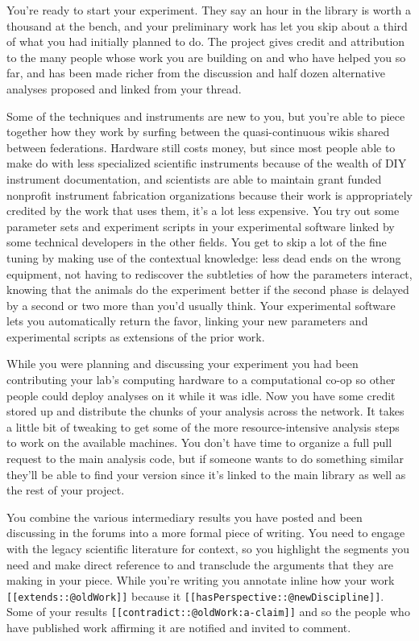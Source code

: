 You're ready to start your experiment. They say an hour in the library
is worth a thousand at the bench, and your preliminary work has let you
skip about a third of what you had initially planned to do. The project
gives credit and attribution to the many people whose work you are
building on and who have helped you so far, and has been made richer
from the discussion and half dozen alternative analyses proposed and
linked from your thread.

Some of the techniques and instruments are new to you, but you're able
to piece together how they work by surfing between the quasi-continuous
wikis shared between federations. Hardware still costs money, but since
most people able to make do with less specialized scientific instruments
because of the wealth of DIY instrument documentation, and scientists
are able to maintain grant funded nonprofit instrument fabrication
organizations because their work is appropriately credited by the work
that uses them, it's a lot less expensive. You try out some parameter
sets and experiment scripts in your experimental software linked by some
technical developers in the other fields. You get to skip a lot of the
fine tuning by making use of the contextual knowledge: less dead ends on
the wrong equipment, not having to rediscover the subtleties of how the
parameters interact, knowing that the animals do the experiment better
if the second phase is delayed by a second or two more than you'd
usually think. Your experimental software lets you automatically return
the favor, linking your new parameters and experimental scripts as
extensions of the prior work.

While you were planning and discussing your experiment you had been
contributing your lab's computing hardware to a computational co-op so
other people could deploy analyses on it while it was idle. Now you have
some credit stored up and distribute the chunks of your analysis across
the network. It takes a little bit of tweaking to get some of the more
resource-intensive analysis steps to work on the available machines. You
don't have time to organize a full pull request to the main analysis
code, but if someone wants to do something similar they'll be able to
find your version since it's linked to the main library as well as the
rest of your project.

You combine the various intermediary results you have posted and been
discussing in the forums into a more formal piece of writing. You need
to engage with the legacy scientific literature for context, so you
highlight the segments you need and make direct reference to and
transclude the arguments that they are making in your piece. While
you're writing you annotate inline how your work
\texttt{{[}{[}extends::@oldWork{]}{]}} because it
\texttt{{[}{[}hasPerspective::@newDiscipline{]}{]}}. Some of your
results \texttt{{[}{[}contradict::@oldWork:a-claim{]}{]}} and so the
people who have published work affirming it are notified and invited to
comment.

